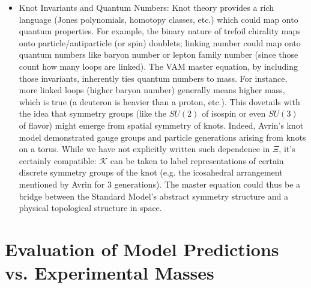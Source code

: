 \begin{itemize}
\item
Knot Invariants and Quantum Numbers: Knot theory provides a rich language (Jones polynomials, homotopy classes, etc.) which could map onto quantum properties. For example, the binary nature of trefoil chirality maps onto particle/antiparticle (or spin) doublets; linking number could map onto quantum numbers like baryon number or lepton family number (since those count how many loops are linked). The VAM master equation, by including those invariants, inherently ties quantum numbers to mass. For instance, more linked loops (higher baryon number) generally means higher mass, which is true (a deuteron is heavier than a proton, etc.). This dovetails with the idea that symmetry groups (like the $SU(2)$ of isospin or even $SU(3)$ of flavor) might emerge from spatial symmetry of knots. Indeed, Avrin’s knot model demonstrated gauge groups and particle generations arising from knots on a torus. While we have not explicitly written such dependence in $\Xi$, it’s certainly compatible: $\mathcal{K}$ can be taken to label representations of certain discrete symmetry groups of the knot (e.g. the icosahedral arrangement mentioned by Avrin for 3 generations). The master equation could thus be a bridge between the Standard Model’s abstract symmetry structure and a physical topological structure in space.

\end{itemize}

\section*{Evaluation of Model Predictions vs. Experimental Masses}

